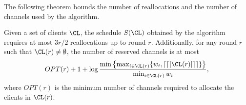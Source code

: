 The following theorem bounds the number of reallocations and the number of channels used by the \constant algorithm.


\begin{theorem}
\label{thm:O(1)realloc}
Given a set of clients $\CL$, the schedule $S(\CL)$ obtained by the \constant algorithm requires at most $3r/2$ reallocations up to round $r$. Additionally, for any round $r$ such that $\CL(r)\neq\emptyset$, the number of reserved channels is at most 
\begin{align*}
OPT(r)+1+\log \frac{\min\left\{\max_{i\in\CL(r)}\{w_i,\lceil\lceil|\CL(r)|\rceil\rceil\}\right\}}{\min_{i\in\CL(r)}w_i},
\end{align*}
where $OPT(r)$ is the minimum number of channels required to allocate the clients in $\CL(r)$.
\end{theorem}



